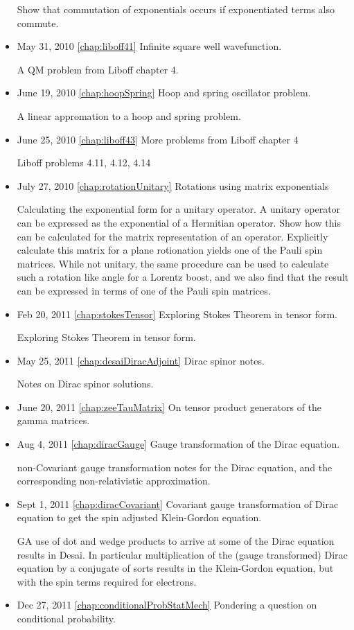 \begin{itemize}
Show that commutation of exponentials occurs if exponentiated terms also commute.\item May 31, 2010 \ref{chap:liboff41} Infinite square well wavefunction.

A QM problem from Liboff chapter 4.\item June 19, 2010 \ref{chap:hoopSpring} Hoop and spring oscillator problem.

A linear appromation to a hoop and spring problem.\item June 25, 2010 \ref{chap:liboff43} More problems from Liboff chapter 4

Liboff problems 4.11, 4.12, 4.14\item July 27, 2010 \ref{chap:rotationUnitary} Rotations using matrix exponentials

Calculating the exponential form for a unitary operator.  A unitary operator can be expressed as the exponential of a Hermitian operator.  Show how this can be calculated for the matrix representation of an operator.  Explicitly calculate this matrix for a plane rotionation yields one of the Pauli spin matrices.  While not unitary, the same procedure can be used to calculate such a rotation like angle for a Lorentz boost, and we also find that the result can be expressed in terms of one of the Pauli spin matrices.\item Feb 20, 2011 \ref{chap:stokesTensor} Exploring Stokes Theorem in tensor form.

Exploring Stokes Theorem in tensor form.\item May 25, 2011 \ref{chap:desaiDiracAdjoint} Dirac spinor notes.

Notes on Dirac spinor solutions.\item June 20, 2011 \ref{chap:zeeTauMatrix} On tensor product generators of the gamma matrices.

\item Aug 4, 2011 \ref{chap:diracGauge} Gauge transformation of the Dirac equation.

non-Covariant gauge transformation notes for the Dirac equation, and the corresponding non-relativistic approximation.\item Sept 1, 2011 \ref{chap:diracCovariant} Covariant gauge transformation of Dirac equation to get the spin adjusted Klein-Gordon equation.

GA use of dot and wedge products to arrive at some of the Dirac equation results in Desai.  In particular multiplication of the (gauge transformed) Dirac equation by a conjugate of sorts results in the Klein-Gordon equation, but with the spin terms required for electrons. \item Dec 27, 2011 \ref{chap:conditionalProbStatMech} Pondering a question on conditional probability.


\end{itemize}
